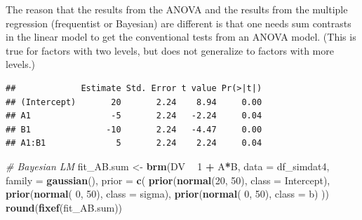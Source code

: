 \documentclass[12pt,]{krantz}
\newenvironment{Shaded}{\begin{snugshade}}{\end{snugshade}}
\newcommand{\CommentTok}[1]{\textcolor[rgb]{0.56,0.35,0.01}{\textit{#1}}}
\newcommand{\DataTypeTok}[1]{\textcolor[rgb]{0.13,0.29,0.53}{#1}}
\newcommand{\DecValTok}[1]{\textcolor[rgb]{0.00,0.00,0.81}{#1}}
\newcommand{\KeywordTok}[1]{\textcolor[rgb]{0.13,0.29,0.53}{\textbf{#1}}}
\newcommand{\NormalTok}[1]{#1}
\newcommand{\OperatorTok}[1]{\textcolor[rgb]{0.81,0.36,0.00}{\textbf{#1}}}
\newcommand{\StringTok}[1]{\textcolor[rgb]{0.31,0.60,0.02}{#1}}
\theoremstyle{definition}
\theoremstyle{definition}
\theoremstyle{definition}
\theoremstyle{remark}
\begin{document}
The reason that the results from the ANOVA and the results from the multiple regression (frequentist or Bayesian) are different is that one needs sum contrasts in the linear model to get the conventional tests from an ANOVA model. (This is true for factors with two levels, but does not generalize to factors with more levels.)

\begin{Shaded}
\end{Shaded}

\begin{verbatim}
##             Estimate Std. Error t value Pr(>|t|)
## (Intercept)       20       2.24    8.94     0.00
## A1                -5       2.24   -2.24     0.04
## B1               -10       2.24   -4.47     0.00
## A1:B1              5       2.24    2.24     0.04
\end{verbatim}

\begin{Shaded}
\begin{Highlighting}[]
\CommentTok{# Bayesian LM}
\NormalTok{fit_AB.sum <-}\StringTok{ }\KeywordTok{brm}\NormalTok{(DV }\OperatorTok{~}\StringTok{ }\DecValTok{1} \OperatorTok{+}\StringTok{ }\NormalTok{A}\OperatorTok{*}\NormalTok{B,}
                 \DataTypeTok{data =}\NormalTok{ df_simdat4,}
                 \DataTypeTok{family =} \KeywordTok{gaussian}\NormalTok{(),}
                 \DataTypeTok{prior =} \KeywordTok{c}\NormalTok{(}
                     \KeywordTok{prior}\NormalTok{(}\KeywordTok{normal}\NormalTok{(}\DecValTok{20}\NormalTok{, }\DecValTok{50}\NormalTok{), }\DataTypeTok{class =}\NormalTok{ Intercept),}
                     \KeywordTok{prior}\NormalTok{(}\KeywordTok{normal}\NormalTok{( }\DecValTok{0}\NormalTok{, }\DecValTok{50}\NormalTok{), }\DataTypeTok{class =}\NormalTok{ sigma),}
                     \KeywordTok{prior}\NormalTok{(}\KeywordTok{normal}\NormalTok{( }\DecValTok{0}\NormalTok{, }\DecValTok{50}\NormalTok{), }\DataTypeTok{class =}\NormalTok{ b)}
\NormalTok{                 )) }
\KeywordTok{round}\NormalTok{(}\KeywordTok{fixef}\NormalTok{(fit_AB.sum))}
\end{Highlighting}
\end{Shaded}
\end{document}
